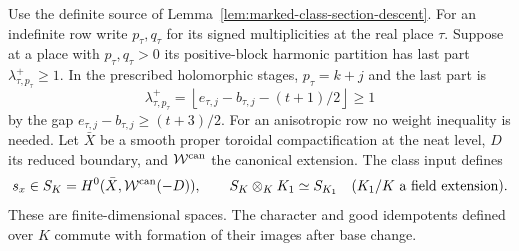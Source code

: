 \begin{auxlemma}
\label{lem:marked-class-section-cuspidal}
Use the definite source of Lemma~\ref{lem:marked-class-section-descent}.
For an indefinite row write \(p_\tau,q_\tau\) for its signed
multiplicities at the real place \(\tau\). Suppose at a place with
\(p_\tau,q_\tau>0\) its positive-block harmonic partition has
last part \(\lambda^+_{\tau,p_\tau}\ge1\). In the prescribed
holomorphic stages, \(p_\tau=k+j\) and the last part is
\[
     \lambda^+_{\tau,p_\tau}
       =\left\lfloor e_{\tau,j}-b_{\tau,j}-(t+1)/2\right\rfloor
       \ge 1
\]
by the gap \(e_{\tau,j}-b_{\tau,j}\ge(t+3)/2\).
For an anisotropic row no weight inequality is needed. Let
\(\bar X\) be a smooth proper toroidal compactification at the
neat level, \(D\) its reduced boundary, and \(\mathcal W^{\rm can}\)
the canonical extension. The class input defines
\[
  s_x\in S_K=H^0(\bar X,\mathcal W^{\rm can}(-D)),\qquad
  S_K\otimes_K K_1\simeq S_{K_1}\quad(K_1/K\text{ a field extension}).
\]
These are finite-dimensional spaces. The character and good
idempotents defined over \(K\) commute with formation of their images
after base change.
\end{auxlemma}
